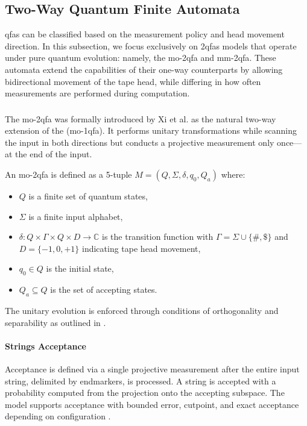 \subsection{Two-Way Quantum Finite Automata}
\label{sec:2-way-qfa}

\glspl{qfa} can be classified based on the measurement policy and head movement direction. In this subsection, we focus exclusively on \glspl{2qfa} models that operate under pure quantum evolution: namely, the \gls{mo-2qfa} and \gls{mm-2qfa}. These automata extend the capabilities of their one-way counterparts by allowing bidirectional movement of the tape head, while differing in how often measurements are performed during computation.

\subsubsection{}

The \gls{mo-2qfa} was formally introduced by Xi et al. \cite{xi2008some} as the natural two-way extension of the (\gls{mo-1qfa}). It performs unitary transformations while scanning the input in both directions but conducts a projective measurement only once—at the end of the input.

\begin{definition}
     An \gls{mo-2qfa} is defined as a 5-tuple $M = (Q, \Sigma, \delta, q_0, Q_a)$ where:
\begin{itemize}
    \item $Q$ is a finite set of quantum states,
    \item $\Sigma$ is a finite input alphabet,
    \item $\delta: Q \times \Gamma \times Q \times D \to \mathbb{C}$ is the transition function with $\Gamma = \Sigma \cup \{\#, \$\}$ and $D = \{-1, 0, +1\}$ indicating tape head movement,
    \item $q_0 \in Q$ is the initial state,
    \item $Q_a \subseteq Q$ is the set of accepting states.
\end{itemize}
\end{definition}

The unitary evolution is enforced through conditions of orthogonality and separability as outlined in \cite{xi2008some}.

\paragraph{Strings Acceptance} Acceptance is defined via a single projective measurement after the entire input string, delimited by endmarkers, is processed. A string is accepted with a probability computed from the projection onto the accepting subspace. The model supports acceptance with bounded error, cutpoint, and exact acceptance depending on configuration \cite{xi2008some}.

